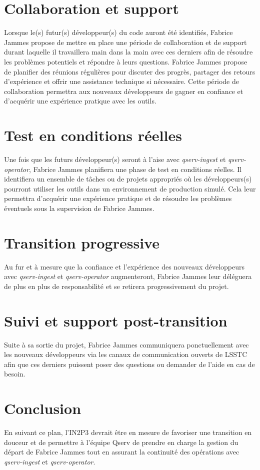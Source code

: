 \documentclass[french]{article}
\begin{document}
	\section{Collaboration et support}
	
	Lorsque le(s) futur(s) développeur(s) du code auront été identifiés, Fabrice Jammes propose de mettre en place une période de collaboration et de support durant laquelle il travaillera main dans la main avec ces derniers afin de résoudre les problèmes potentiels et répondre à leurs questions. Fabrice Jammes propose de planifier des réunions régulières pour discuter des progrès, partager des retours d'expérience et offrir une assistance technique si nécessaire. Cette période de collaboration permettra aux nouveaux développeurs de gagner en confiance et d'acquérir une expérience pratique avec les outils.
	
	\section{Test en conditions réelles}
	
	 Une fois que les futurs développeur(s) seront à l'aise avec \textit{qserv-ingest} et \textit{qserv-operator}, Fabrice Jammes planifiera une phase de test en conditions réelles. Il identifiera un ensemble de tâches ou de projets appropriés où les développeurs(s) pourront utiliser les outils dans un environnement de production simulé. Cela leur permettra d'acquérir une expérience pratique et de résoudre les problèmes éventuels sous la supervision de Fabrice Jammes.
	 
	 \section{Transition progressive}
	
	Au fur et à mesure que la confiance et l'expérience des nouveaux développeurs avec \textit{qserv-ingest} et \textit{qserv-operator} augmenteront, Fabrice Jammes leur déléguera de plus en plus de responsabilité et se retirera progressivement du projet.
	
	\section{Suivi et support post-transition}
	
	Suite à sa sortie du projet, Fabrice Jammes communiquera ponctuellement avec les nouveaux développeurs via les canaux de communication ouverts de LSSTC afin que ces derniers puissent poser des questions ou demander de l'aide en cas de besoin.
	
	\section{Conclusion}
	
	En suivant ce plan, l'IN2P3 devrait être en mesure de favoriser une transition en douceur et de permettre à l'équipe Qserv de prendre en charge la gestion du départ de Fabrice Jammes tout en assurant la continuité des opérations avec \textit{qserv-ingest} et \textit{qserv-operator}.
	
\end{document}

